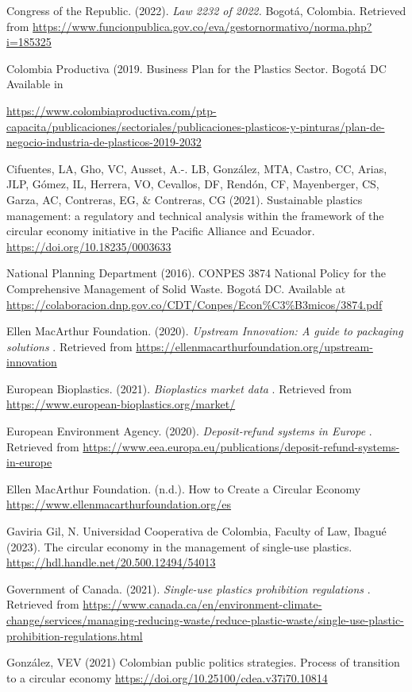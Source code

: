 \documentclass[
  12pt,
  oneside]{book}
\begin{document}
Congress of the Republic. (2022). \emph{Law 2232 of 2022. }Bogotá,
Colombia. Retrieved from
\url{https://www.funcionpublica.gov.co/eva/gestornormativo/norma.php?i=185325}

Colombia Productiva (2019. Business Plan for the Plastics Sector. Bogotá
DC Available in

\url{https://www.colombiaproductiva.com/ptp-capacita/publicaciones/sectoriales/publicaciones-plasticos-y-pinturas/plan-de-negocio-industria-de-plasticos-2019-2032}

Cifuentes, LA, Gho, VC, Ausset, A.-. LB, González, MTA, Castro, CC,
Arias, JLP, Gómez, IL, Herrera, VO, Cevallos, DF, Rendón, CF,
Mayenberger, CS, Garza, AC, Contreras, EG, \& Contreras, CG (2021).
Sustainable plastics management: a regulatory and technical analysis
within the framework of the circular economy initiative in the Pacific
Alliance and Ecuador. \url{https://doi.org/10.18235/0003633}

National Planning Department (2016). CONPES 3874 National Policy for the
Comprehensive Management of Solid Waste. Bogotá DC. Available at
\url{https://colaboracion.dnp.gov.co/CDT/Conpes/Econ\%C3\%B3micos/3874.pdf}

Ellen MacArthur Foundation. (2020). \emph{Upstream Innovation: A guide
to packaging solutions }. Retrieved from
\url{https://ellenmacarthurfoundation.org/upstream-innovation}

European Bioplastics. (2021). \emph{Bioplastics market data }. Retrieved
from \url{https://www.european-bioplastics.org/market/}

European Environment Agency. (2020). \emph{Deposit-refund systems in
Europe }. Retrieved from
\url{https://www.eea.europa.eu/publications/deposit-refund-systems-in-europe}

Ellen MacArthur Foundation. (n.d.). How to Create a Circular Economy
\url{https://www.ellenmacarthurfoundation.org/es}

Gaviria Gil, N. Universidad Cooperativa de Colombia, Faculty of Law,
Ibagué (2023). The circular economy in the management of single-use
plastics. \url{https://hdl.handle.net/20.500.12494/54013}

Government of Canada. (2021). \emph{Single-use plastics prohibition
regulations }. Retrieved from
\url{https://www.canada.ca/en/environment-climate-change/services/managing-reducing-waste/reduce-plastic-waste/single-use-plastic-prohibition-regulations.html}

González, VEV (2021) Colombian public politics strategies. Process of
transition to a circular economy
\url{https://doi.org/10.25100/cdea.v37i70.10814}\\
\end{document}
